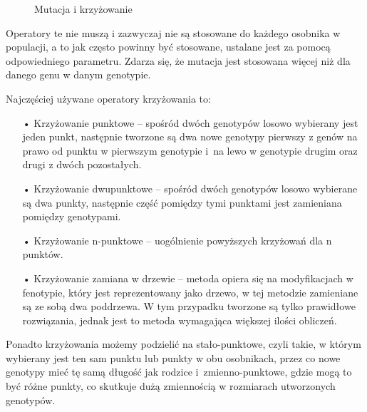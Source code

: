 \begin{figure}[H]
	\caption{\label{fig:mutation-and-crossover-operations}Mutacja i krzyżowanie \cite{memetic}}
\end{figure}

Operatory te nie muszą i zazwyczaj nie są stosowane do każdego osobnika w populacji, a to jak często powinny być stosowane, ustalane jest za pomocą odpowiedniego parametru. Zdarza się, że mutacja jest stosowana więcej niż dla danego genu w danym genotypie.

Najczęściej używane operatory krzyżowania to:
\begin{itemize}
\item[•] Krzyżowanie punktowe -- spośród dwóch genotypów losowo wybierany jest jeden punkt, następnie tworzone są dwa nowe genotypy pierwszy z genów na prawo od punktu w pierwszym genotypie i~na lewo w genotypie drugim oraz drugi z dwóch pozostałych.

\item[•] Krzyżowanie dwupunktowe -- spośród dwóch genotypów losowo wybierane są dwa punkty, następnie część pomiędzy tymi punktami jest zamieniana pomiędzy genotypami.

\item[•] Krzyżowanie n-punktowe -- uogólnienie powyższych krzyżowań dla n punktów.

\item[•] Krzyżowanie zamiana w drzewie -- metoda opiera się na modyfikacjach w fenotypie, który jest reprezentowany jako drzewo, w tej metodzie zamieniane są ze sobą dwa poddrzewa. W tym przypadku tworzone są tylko prawidłowe rozwiązania, jednak jest to metoda wymagająca większej ilości obliczeń.  
\end{itemize}
Ponadto krzyżowania możemy podzielić na stało-punktowe, czyli takie, w którym wybierany jest ten sam punktu lub punkty w obu osobnikach, przez co nowe genotypy mieć tę samą długość jak rodzice i~zmienno-punktowe, gdzie mogą to być różne punkty, co skutkuje dużą zmiennością w rozmiarach utworzonych genotypów. 

